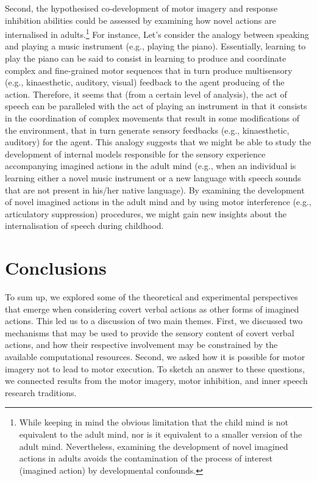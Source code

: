 \documentclass[utf8]{template/frontiersSCNS} %
\begin{document}
Second, the hypothesised co-development of motor imagery and response inhibition abilities could be assessed by examining how novel actions are internalised in adults.\footnote{While keeping in mind the obvious limitation that the child mind is not equivalent to the adult mind, nor is it equivalent to a smaller version of the adult mind. Nevertheless, examining the development of novel imagined actions in adults avoids the contamination of the process of interest (imagined action) by developmental confounds.} For instance, Let’s consider the analogy between speaking and playing a music instrument (e.g., playing the piano). Essentially, learning to play the piano can be said to consist in learning to produce and coordinate complex and fine-grained motor sequences that in turn produce multisensory (e.g., kinaesthetic, auditory, visual) feedback to the agent producing of the action. Therefore, it seems that (from a certain level of analysis), the act of speech can be paralleled with the act of playing an instrument in that it consists in the coordination of complex movements that result in some modifications of the environment, that in turn generate sensory feedbacks (e.g., kinaesthetic, auditory) for the agent. This analogy suggests that we might be able to study the development of internal models responsible for the sensory experience accompanying imagined actions in the adult mind (e.g., when an individual is learning either a novel music instrument or a new language with speech sounds that are not present in his/her native language). By examining the development of novel imagined actions in the adult mind and by using motor interference (e.g., articulatory suppression) procedures, we might gain new insights about the internalisation of speech during childhood.

\section{Conclusions}


To sum up, we explored some of the theoretical and experimental perspectives that emerge when considering covert verbal actions as other forms of imagined actions. This led us to a discussion of two main themes. First, we discussed two mechanisms that may be used to provide the sensory content of covert verbal actions, and how their respective involvement may be constrained by the available computational resources. Second, we asked how it is possible for motor imagery not to lead to motor execution. To sketch an answer to these questions, we connected results from the motor imagery, motor inhibition, and inner speech research traditions.
\end{document}
